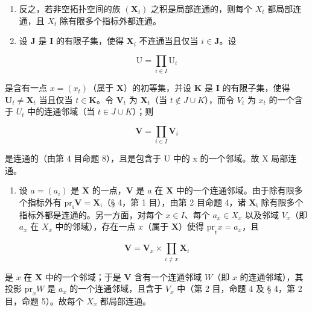 \begin{enumerate}
\def\labelenumi{\alph{enumi})}
\setcounter{enumi}{1}
\item
  反之，若非空拓扑空间的族 \((\mathbf{X}_{t})\) 之积是局部连通的，则每个 \(X_{t}\) 都局部连通，且 \(X_{t}\) 除有限多个指标外都连通。
\item
  设 \(\mathbf{J}\) 是 \(\mathbf{I}\) 的有限子集，使得 \(\mathbf{X}_i\) 不连通当且仅当 \(i \in \mathbf{J}\)。设
\end{enumerate}

\[
\mathrm{U} = \prod_ {i \in I} \mathrm{U} _ {i}
\]

是含有一点 \(x = (x_{t})\)（属于 \(\mathbf{X}\)）的初等集，并设 \(\mathbf{K}\) 是 \(\mathbf{I}\) 的有限子集，使得 \(\mathbf{U}_{t} \neq \mathbf{X}_{t}\) 当且仅当 \(t \in \mathbf{K}\)。令 \(\mathbf{V}_{t}\) 为 \(\mathbf{X}_{t}\)（当 \(t \notin J \cup K\)），而令 \(V_{t}\) 为 \(x_{t}\) 的一个含于 \(U_{t}\) 中的连通邻域（当 \(t \in J \cup K\)）；则

\[
\mathbf {V} = \prod_ {i \in I} \mathbf {V} _ {i}
\]

是连通的（由第 4 目命题 8），且是包含于 U 中的 x 的一个邻域。故 X 局部连通。

\begin{enumerate}
\def\labelenumi{\alph{enumi})}
\setcounter{enumi}{1}
\tightlist
\item
  设 \(a = (a_{i})\) 是 \(\mathbf{X}\) 的一点，\(\mathbf{V}\) 是 \(a\) 在 \(\mathbf{X}\) 中的一个连通邻域。由于除有限多个指标外有 \(\mathrm{pr}_{\mathfrak{i}}\mathbf{V} = \mathbf{X}_{\mathfrak{i}}\)（§ 4，第 1 目），由第 2 目命题 4，诸 \(\mathbf{X}_{\mathfrak{i}}\) 除有限多个指标外都是连通的。另一方面，对每个 \(x \in I\)、每个 \(a_{x} \in X_{x}\) 以及邻域 \(V_{x}\)（即 \(a_{x}\) 在 \(X_{x}\) 中的邻域），存在一点 \(x\)（属于 \(\mathbf{X}\)）使得 \(\mathrm{pr}_{\mathfrak{x}}x = a_{x}\)，且
\end{enumerate}

\[
\mathbf {V} = \mathbf {V} _ {x} \times \prod_ {i \neq x} \mathbf {X} _ {i}
\]

是 \(x\) 在 \(\mathbf{X}\) 中的一个邻域；于是 \(\mathbf{V}\) 含有一个连通邻域 \(W\)（即 \(x\) 的连通邻域），其投影 \(\mathrm{pr}_xW\) 是 \(a_x\) 的一个连通邻域，且含于 \(V_x\) 中（第 2 目，命题 4 及 § 4，第 2 目，命题 5）。故每个 \(X_x\) 都局部连通。

